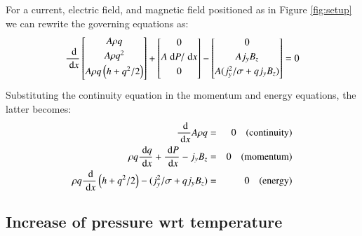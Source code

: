 \documentclass[oneside,10pt,onecolumn]{waflreport}
\newcommand{\ordi}{\; {\rm d}}
\newcommand{\alb}{\vspace{0.1cm}\\} %
\begin{document}
For a current, electric field, and magnetic field positioned as in Figure
\ref{fig:setup} we can rewrite the governing equations as:
%
\begin{equation}
  \frac{\ordi}{\ordi x}
     \left[
      \begin{array}{@{}c@{}}
        A {\rho} q \alb
        A {\rho} q^2\alb
        A {\rho} q \left(h+q^2/2\right)\alb
      \end{array}
    \right]
  +\left[
      \begin{array}{@{}c@{}}
      0 \alb
      A \ordi P / \ordi x\alb
      0 \alb
      \end{array}
   \right]
  -\left[
      \begin{array}{@{}c@{}}
      0 \alb
      A j_y B_z\alb
      A (j_y^2/\sigma + q j_y B_z)\alb
      \end{array}
   \right]=0
\end{equation}
%
Substituting the continuity equation in the momentum and energy equations, the latter
becomes:
%
\begin{eqnarray}
\frac{\ordi}{\ordi x} A \rho q &=& 0 {\rm ~~~~(continuity)}\label{eqn:continuity}\alb
  \rho q \frac{\ordi q}{\ordi x} +  \frac{\ordi P}{\ordi x} -  j_y B_z &=&0 {\rm ~~~~(momentum)}\label{eqn:momentum}\alb
  \rho q \frac{\ordi}{\ordi x} \left( h+q^2/2 \right) - (j_y^2/\sigma + q j_y B_z)&=&0 {\rm ~~~~(energy)}\label{eqn:energy}
\end{eqnarray}
%



\subsection{Increase of pressure wrt temperature}
\end{document}

